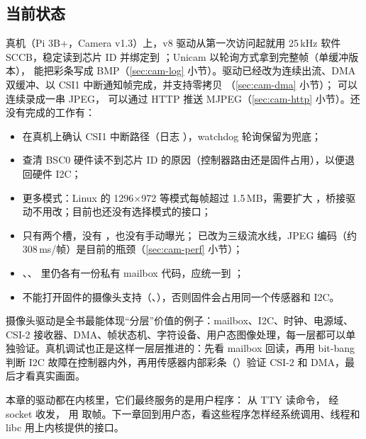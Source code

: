 \subsection{当前状态}

真机（Pi 3B+，Camera v1.3）上，v8 驱动从第一次访问起就用 25\,kHz 软件 SCCB，稳定读到芯片 ID  并绑定到 ；Unicam 以轮询方式拿到完整帧（单缓冲版本）， 能把彩条写成 BMP（\ref{sec:cam-log} 小节）。驱动已经改为连续出流、DMA 双缓冲、以 CSI1 中断通知帧完成，并支持零拷贝 （\ref{sec:cam-dma} 小节）； 可以连续录成一串 JPEG， 可以通过 HTTP 推送 MJPEG（\ref{sec:cam-http} 小节）。还没有完成的工作有：

\begin{itemize}
  \item 在真机上确认 CSI1 中断路径（日志 ），watchdog 轮询保留为兜底；
  \item 查清 BSC0 硬件读不到芯片 ID 的原因（控制器路由还是固件占用），以便退回硬件 I2C；
  \item 更多模式：Linux 的 1296$\times$972 等模式每帧超过 1.5\,MB，需要扩大 ，桥接驱动不用改；目前也还没有选择模式的接口；
  \item 只有两个槽，没有 ，也没有手动曝光； 已改为三级流水线，JPEG 编码（约 308\,ms/帧）是目前的瓶颈（\ref{sec:cam-perf} 小节）；
  \item {}、、 里仍各有一份私有 mailbox 代码，应统一到 ；
  \item {} 不能打开固件的摄像头支持（、），否则固件会占用同一个传感器和 I2C。
\end{itemize}

\begin{remark}
  摄像头驱动是全书最能体现“分层”价值的例子：mailbox、I2C、时钟、电源域、CSI-2 接收器、DMA、帧状态机、字符设备、用户态图像处理，每一层都可以单独验证。真机调试也正是这样一层层推进的：先看 mailbox 回读，再用 bit-bang 判断 I2C 故障在控制器内外，再用传感器内部彩条（）验证 CSI-2 和 DMA，最后才看真实画面。
\end{remark}

本章的驱动都在内核里，它们最终服务的是用户程序： 从 TTY 读命令， 经 socket 收发， 用  取帧。下一章回到用户态，看这些程序怎样经系统调用、线程和 libc 用上内核提供的接口。
